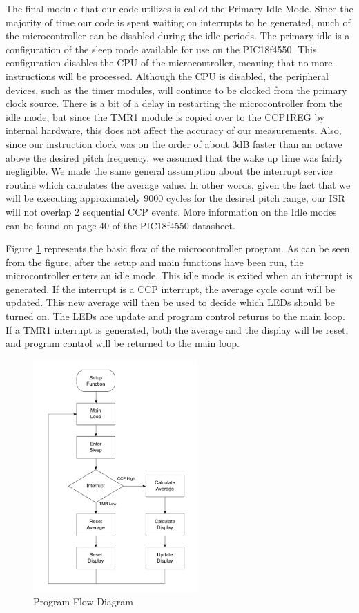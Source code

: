 \documentclass[12pt]{article}
\begin{document}
The final module that our code utilizes is called the Primary Idle Mode. Since the majority of time
our code is spent waiting on interrupts to be generated, much of the microcontroller can be disabled
during the idle periods. The primary idle is a configuration of the sleep mode available for use on
the PIC18f4550. This configuration disables the CPU of the microcontroller, meaning that no more
instructions will be processed. Although the CPU is disabled, the peripheral devices, such as the
timer modules, will continue to be clocked from the primary clock source. There is a bit of a delay
in restarting the microcontroller from the idle mode, but since the TMR1 module is copied over to
the CCP1REG by internal hardware, this does not affect the accuracy of our measurements. Also, since our
instruction clock was on the order of about 3dB faster than an octave above the desired pitch frequency,
we assumed that the wake up time was fairly negligible. We made the same general assumption about
the interrupt service routine which calculates the average value. In other words, given the fact that we
will be executing approximately 9000 cycles for the desired pitch range, our ISR will not overlap 2
sequential CCP events. More information on the Idle modes can be found on page 40 of the 
PIC18f4550 datasheet.

Figure \ref{micro_chart}  represents the basic flow of the microcontroller program.  As can be seen from the figure, after the setup and main functions have been run, the microcontroller enters an idle mode.  This idle mode is exited when an interrupt is generated.  If the interrupt is a CCP interrupt, the average cycle count will be updated.  This new average will then be used to decide which LEDs should be turned on.  The LEDs are update and program control returns to the main loop.  If a TMR1 interrupt is generated, both the average and the display will be reset, and program control will be returned to the main loop.

\begin{figure}[H]
\centering
	\includegraphics[height=3.5in]{"MicroChart"}
	\caption{Program Flow Diagram}
	\label{micro_chart} 
\end{figure}
\end{document}
